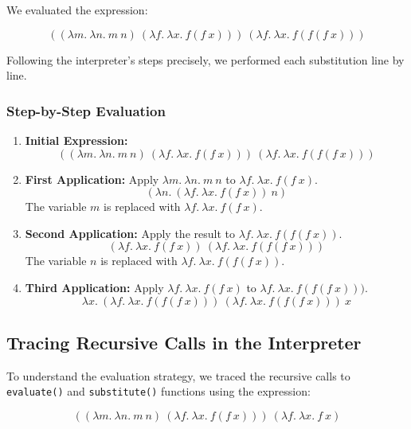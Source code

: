 \documentclass{article}
\begin{document}
We evaluated the expression:

\[
\left((\lambda m.\ \lambda n.\ m\ n)\ (\lambda f.\ \lambda x.\ f(f\ x))\right)\ (\lambda f.\ \lambda x.\ f(f(f\ x)))
\]

Following the interpreter's steps precisely, we performed each substitution line by line.

\subsubsection*{Step-by-Step Evaluation}

\begin{enumerate}
    \item \textbf{Initial Expression:}
    \[
    ((\lambda m.\ \lambda n.\ m\ n)\ (\lambda f.\ \lambda x.\ f(f\ x)))\ (\lambda f.\ \lambda x.\ f(f(f\ x)))
    \]

    \item \textbf{First Application:} Apply \(\lambda m.\ \lambda n.\ m\ n\) to \(\lambda f.\ \lambda x.\ f(f\ x)\).
    \[
    (\lambda n.\ (\lambda f.\ \lambda x.\ f(f\ x))\ n)
    \]
    The variable \(m\) is replaced with \(\lambda f.\ \lambda x.\ f(f\ x)\).

    \item \textbf{Second Application:} Apply the result to \(\lambda f.\ \lambda x.\ f(f(f\ x))\).
    \[
    (\lambda f.\ \lambda x.\ f(f\ x))\ (\lambda f.\ \lambda x.\ f(f(f\ x)))
    \]
    The variable \(n\) is replaced with \(\lambda f.\ \lambda x.\ f(f(f\ x))\).

    \item \textbf{Third Application:} Apply \(\lambda f.\ \lambda x.\ f(f\ x)\) to \(\lambda f.\ \lambda x.\ f(f(f\ x)))\).
    \[
    \lambda x.\ (\lambda f.\ \lambda x.\ f(f(f\ x)))\ (\lambda f.\ \lambda x.\ f(f(f\ x)))\ x
    \]

\end{enumerate}

\subsection*{Tracing Recursive Calls in the Interpreter}

To understand the evaluation strategy, we traced the recursive calls to \texttt{evaluate()} and \texttt{substitute()} functions using the expression:

\[
((\lambda m.\ \lambda n.\ m\ n)\ (\lambda f.\ \lambda x.\ f(f\ x)))\ (\lambda f.\ \lambda x.\ f\ x)
\]
\end{document}
